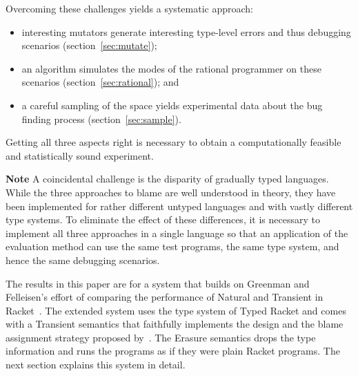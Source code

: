 Overcoming these challenges yields a systematic approach: 
\begin{itemize}

\item interesting mutators generate interesting type-level errors and thus
debugging scenarios (section~\ref{sec:mutate});
    
\item an algorithm simulates the modes of the rational programmer on these
scenarios (section~\ref{sec:rational}); and

\item a careful sampling of the space yields experimental
data about the bug finding process (section~\ref{sec:sample}).
\end{itemize}
Getting all three aspects right is necessary to obtain a computationally
feasible and statistically sound experiment.

{\bf Note} A coincidental challenge is the disparity of gradually typed
languages. While the three approaches to blame are well understood in theory,
they have been implemented for rather different untyped languages and with
vastly different type systems. To eliminate the effect of these differences, it
is necessary to implement all three approaches in a single language so that an
application of the evaluation method can use the same test programs, the same
type system, and hence the same debugging scenarios.

The results in this paper are for a system that builds on Greenman and
Felleisen's effort of comparing the performance of Natural and Transient in
Racket~\cite{gf-icfp-2018}. The extended system uses the type system of Typed
Racket and comes with a Transient semantics that faithfully implements the
design and the blame assignment strategy proposed by~\cite{vss-popl-2017}. The
Erasure semantics drops the type information and runs the programs as if they
were plain Racket programs. The next section explains this system in detail.
